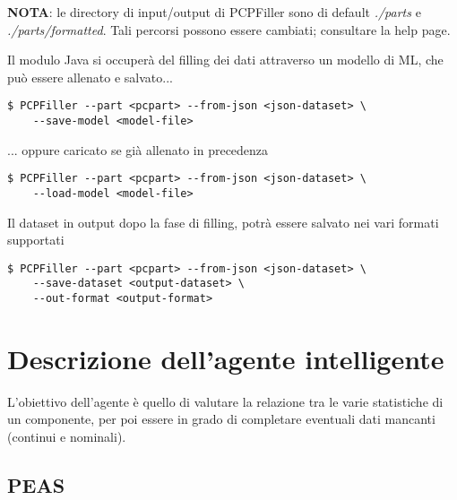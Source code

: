 \documentclass[12pt]{report}
\begin{document}
\textbf{NOTA}: le directory di input/output di PCPFiller sono di default \textit{./parts} e
\textit{./parts/formatted}. Tali percorsi possono essere cambiati; consultare la help page.

Il modulo Java si occuperà del filling dei dati attraverso un modello di ML, che può essere allenato e salvato...
\begin{lstlisting}
$ PCPFiller --part <pcpart> --from-json <json-dataset> \
	--save-model <model-file>
\end{lstlisting}

... oppure caricato se già allenato in precedenza
\begin{lstlisting}
$ PCPFiller --part <pcpart> --from-json <json-dataset> \
	--load-model <model-file>
\end{lstlisting}

Il dataset in output dopo la fase di filling, potrà essere salvato nei vari formati supportati
\begin{lstlisting}
$ PCPFiller --part <pcpart> --from-json <json-dataset> \
	--save-dataset <output-dataset> \
	--out-format <output-format>
\end{lstlisting}

\newpage
\section{Descrizione dell'agente intelligente}

L'obiettivo dell'agente è quello di valutare la relazione tra le varie statistiche di un componente,
per poi essere in grado di completare eventuali dati mancanti (continui e nominali).

\subsection{PEAS}
\end{document}
